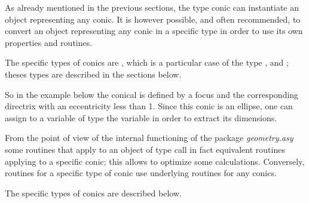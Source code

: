 \documentclass[pdftex]{article}
\newcommand{\geo}{the package \emph{geometry.asy}\xspace}
\begin{document}
As already mentioned in the previous sections, the type conic can
instantiate an object representing any conic.
It is however possible, and often recommended, to convert an object
representing any conic in a specific type in order to use its own
properties and routines.

The specific types of conics are , which is a particular case
of the type ,  and ;
theses types are described in the sections below.

So in the example below the conical  is defined by a focus and the
corresponding directrix with an eccentricity less than 1. Since this
conic is an ellipse, one can assign to a variable of type
 the variable  in order to extract its
dimensions.

From the point of view of the internal functioning of \geo some
routines that apply to an object of type  call in fact
equivalent routines applying to a specific conic; this allows to
optimize some calculations. Conversely, routines for a specific
type of conic use underlying routines for any conics.

The specific types of conics are described below.

\end{document}
